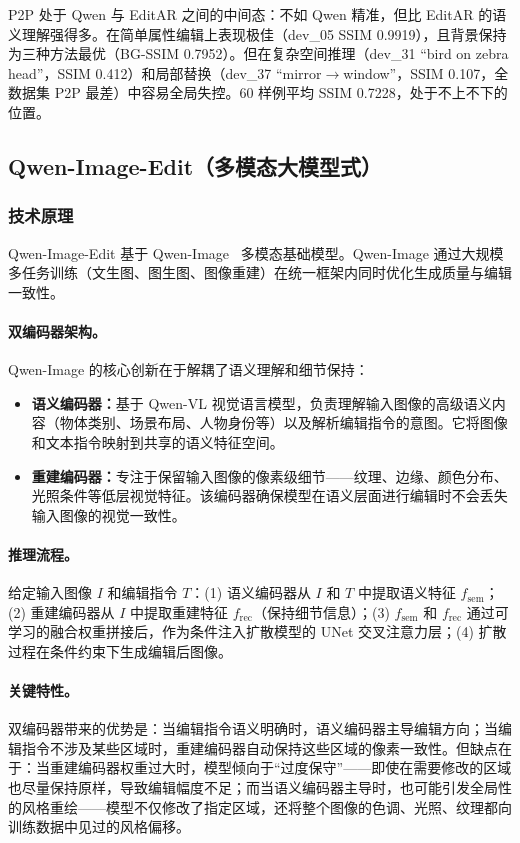 \documentclass[UTF8,11pt,a4paper,fontset=fandol]{ctexart}
\begin{document}
P2P 处于 Qwen 与 EditAR 之间的中间态：不如 Qwen 精准，但比 EditAR 的语义理解强得多。在简单属性编辑上表现极佳（dev\_05 SSIM 0.9919），且背景保持为三种方法最优（BG-SSIM 0.7952）。但在复杂空间推理（dev\_31 “bird on zebra head”，SSIM 0.412）和局部替换（dev\_37 “mirror$\rightarrow$window”，SSIM 0.107，全数据集 P2P 最差）中容易全局失控。60 样例平均 SSIM 0.7228，处于不上不下的位置。

\subsection{Qwen-Image-Edit（多模态大模型式）}

\subsubsection{技术原理}

Qwen-Image-Edit 基于 Qwen-Image~\cite{qwenimage} 多模态基础模型。Qwen-Image 通过大规模多任务训练（文生图、图生图、图像重建）在统一框架内同时优化生成质量与编辑一致性。

\paragraph{双编码器架构。}
Qwen-Image 的核心创新在于解耦了语义理解和细节保持：
\begin{itemize}
  \item \textbf{语义编码器：}基于 Qwen-VL 视觉语言模型，负责理解输入图像的高级语义内容（物体类别、场景布局、人物身份等）以及解析编辑指令的意图。它将图像和文本指令映射到共享的语义特征空间。
  \item \textbf{重建编码器：}专注于保留输入图像的像素级细节——纹理、边缘、颜色分布、光照条件等低层视觉特征。该编码器确保模型在语义层面进行编辑时不会丢失输入图像的视觉一致性。
\end{itemize}

\paragraph{推理流程。}
给定输入图像 $I$ 和编辑指令 $T$：(1) 语义编码器从 $I$ 和 $T$ 中提取语义特征 $f_{\mathrm{sem}}$；(2) 重建编码器从 $I$ 中提取重建特征 $f_{\mathrm{rec}}$（保持细节信息）；(3) $f_{\mathrm{sem}}$ 和 $f_{\mathrm{rec}}$ 通过可学习的融合权重拼接后，作为条件注入扩散模型的 UNet 交叉注意力层；(4) 扩散过程在条件约束下生成编辑后图像。

\paragraph{关键特性。}
双编码器带来的优势是：当编辑指令语义明确时，语义编码器主导编辑方向；当编辑指令不涉及某些区域时，重建编码器自动保持这些区域的像素一致性。但缺点在于：当重建编码器权重过大时，模型倾向于“过度保守”——即使在需要修改的区域也尽量保持原样，导致编辑幅度不足；而当语义编码器主导时，也可能引发全局性的风格重绘——模型不仅修改了指定区域，还将整个图像的色调、光照、纹理都向训练数据中见过的风格偏移。
\end{document}
